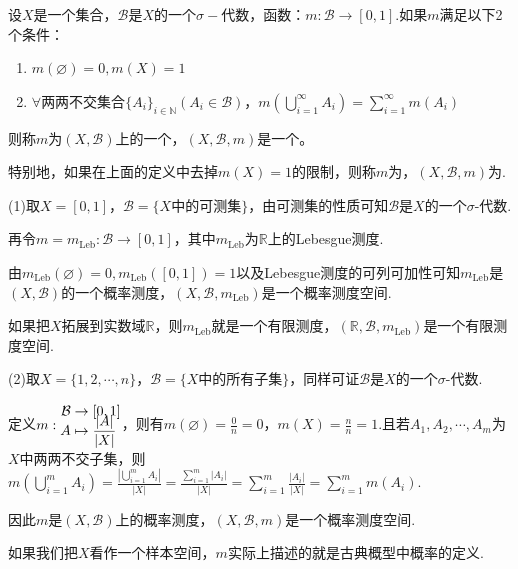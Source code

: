 \begin{definition}[概率测度]
    \wideline
    设$X$是一个集合，$\mathcal{B}$是$X$的一个$\sigma-\text{代数}$，函数：$m:\mathcal{B}\rightarrow[0,1]$.如果$m$满足以下2个条件：

    \begin{enumerate}
        \item $m(\varnothing)=0,m(X)=1$
        \item $\forall$两两不交集合$\{A_i\}_{i\in\mathbb{N}}(A_i\in\mathcal{B})$，$m\left(\bigcup_{i=1}^{\infty}{A_i}\right)=\sum_{i=1}^{\infty}{m(A_i)}$
    \end{enumerate}
    则称$m$为$(X,\mathcal{B})$上的一个，$(X,\mathcal{B},m)$是一个。
\end{definition}
特别地，如果在上面的定义中去掉$m(X)=1$的限制，则称$m$为，$(X,\mathcal{B},m)$为.

\begin{instance}
    (1)取$X=[0,1]$，$\mathcal{B}=\{X\text{中的可测集}\}$，由可测集的性质可知$\mathcal{B}$是$X$的一个$\sigma$-代数.\par

    再令$m=m_{\mathrm{Leb}}:\mathcal{B}\rightarrow [0,1]$，其中$m_{\mathrm{Leb}}$为$\mathbb{R}$上的Lebesgue测度.\par
    由$m_{\mathrm{Leb}}(\varnothing)=0,m_{\mathrm{Leb}}([0,1])=1$以及Lebesgue测度的可列可加性可知$m_{\mathrm{Leb}}$是$(X,\mathcal{B})$的一个概率测度，$(X,\mathcal{B},m_{\mathrm{Leb}})$是一个概率测度空间.\par
    如果把$X$拓展到实数域$\mathbb{R}$，则$m_{\mathrm{Leb}}$就是一个有限测度，$(\mathbb{R},\mathcal{B},m_{\mathrm{Leb}})$是一个有限测度空间.\par
    (2)取$X=\{1,2,\cdots,n\}$，$\mathcal{B}=\{X\text{中的所有子集}\}$，同样可证$\mathcal{B}$是$X$的一个$\sigma$-代数.\par
    定义$m:{\setlength{\jot}{-0.5em}\begin{aligned}
        \mathcal{B}&\to [0,1]\\
        A&\mapsto \frac{|A|}{|X|}
    \end{aligned}}$，则有$m(\varnothing)=\frac{0}{n}=0$，$m(X)=\frac{n}{n}=1$.且若$A_1,A_2,\cdots,A_m$为$X$中两两不交子集，则$m\left(\bigcup_{i=1}^m{A_i}\right)=\frac{\left|\displaystyle\bigcup_{i=1}^m{A_i}\right|}{|X|}=\frac{\displaystyle\sum_{i=1}^m{|A_i|}}{|X|}=\sum_{i=1}^m{\frac{|A_i|}{|X|}}=\sum_{i=1}^m{m(A_i)}$.\par
    因此$m$是$(X,\mathcal{B})$上的概率测度，$(X,\mathcal{B},m)$是一个概率测度空间.\par
    如果我们把$X$看作一个样本空间，$m$实际上描述的就是古典概型中概率的定义.
\end{instance}

